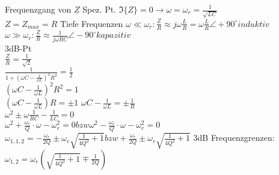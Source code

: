 Frequenzgang von $\underline Z$
Spez. Pt. $\Im{\{Z\}} = 0 \rightarrow \omega = \omega_r=\frac{1}{\sqrt{LC}}$\\
$Z = Z_{max} = R$
Tiefe Frequenzen $\omega \ll \omega_r: \frac{\underline Z}{R} \approx
j\omega\frac{L}{R}=\omega\frac{L}{R} \angle +90^\circ induktiv$\\
$\omega \gg \omega_r: \frac{\underline Z}{R} \approx \frac{1}{j\omega RC}
\angle -90^\circ kapazitiv$\\
3dB-Pt\\
$\frac{Z}{R}=\frac{1}{\sqrt{2}}$\\
$\frac{1}{1+(\omega C-\frac{1}{\omega L})^2R^2}=\frac{1}{2}$\\
$(\omega C-\frac{1}{\omega L})^2R^2 = 1$\\
$(\omega C - \frac{1}{\omega L})R = \pm 1$
$\omega C - \frac{1}{\omega L} = \pm \frac{1}{R}$\\
$\omega^2 \pm \omega \frac{1}{RC}-\frac{1}{LC} = 0$\\
$\omega^2 + \frac{\omega_r}{Q}\cdot \omega - \omega_r^2=0 bzw \omega^2 -
\frac{\omega_r}{Q}\cdot \omega - \omega_r^2=0$\\
$\omega_{1,1,2} = -\frac{\omega_r}{2Q} \pm \omega_r\sqrt{\frac{1}{4Q^2}+1} bzw
+\frac{\omega_r}{2Q} \pm \omega_r\sqrt{\frac{1}{4Q^2}+1}$
3dB Frequenzgrenzen: $\omega_{1,2}=\omega_r(\sqrt{\frac{1}{4Q^2}+1}\mp\frac{1}{2Q})$
